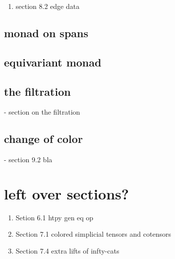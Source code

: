 \documentclass[a4paper,10pt
]{article}%
\renewcommand{\1}{\ensuremath{\mathbb{id}}}
\begin{document}
\begin{enumerate}
\item section 8.2 edge data
\end{enumerate}

\subsection{monad on spans}

\subsection{equivariant monad}

\subsection{the filtration}

- section on the filtration


\subsection{change of color}
- section 9.2 bla


\section{left over sections?}

\begin{enumerate}
\item Setion 6.1 htpy gen eq op
\item Section 7.1 colored simplicial tensors and cotensors
\item Section 7.4 extra lifts of infty-cats
\end{enumerate}
\end{document}
